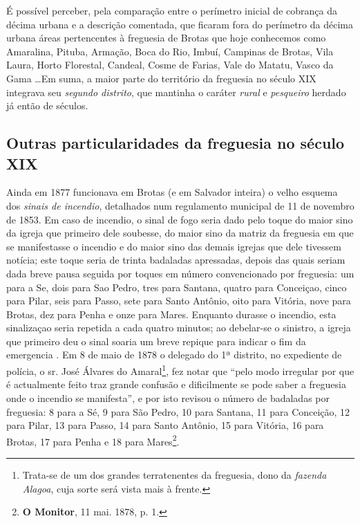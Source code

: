 \begin{enumerate}
\end{enumerate}

É possível perceber, pela comparação entre o perímetro inicial de cobrança da décima urbana e a descrição comentada, que ficaram fora do perímetro da décima urbana áreas pertencentes à freguesia de Brotas que hoje conhecemos como Amaralina, Pituba, Armação, Boca do Rio, Imbuí, Campinas de Brotas, Vila Laura, Horto Florestal, Candeal, Cosme de Farias, Vale do Matatu, Vasco da Gama \dots Em suma, a maior parte do território da freguesia no século XIX integrava seu \textit{segundo distrito}, que mantinha o caráter \textit{rural} e \textit{pesqueiro} herdado já então de séculos.

\subsection{Outras particularidades da freguesia no século XIX}

Ainda em 1877 funcionava em Brotas (e em Salvador inteira) o velho esquema dos \textit{sinais de incendio}, detalhados num regulamento municipal de 11 de novembro de 1853. Em caso de incendio, o sinal de fogo seria dado pelo toque do maior sino da igreja que primeiro dele soubesse, do maior sino da matriz da freguesia em que se manifestasse o incendio e do maior sino das demais igrejas que dele tivessem notícia; este toque seria de trinta badaladas apressadas, depois das quais seriam dada breve pausa seguida por toques em número convencionado por freguesia: um para a Se, dois para Sao Pedro, tres para Santana, quatro para Conceiçao, cinco para Pilar, seis para Passo, sete para Santo Antônio, oito para Vitória, nove para Brotas, dez para Penha e onze para Mares. Enquanto durasse o incendio, esta sinalizaçao seria repetida a cada quatro minutos; ao debelar-se o sinistro, a igreja que primeiro deu o sinal soaria um breve repique para indicar o fim da emergencia \cite[pp.~192-193]{macosta_almana_1877}. Em 8 de maio de 1878 o delegado do 1ª distrito, no expediente de polícia, o sr. José Álvares do Amaral\footnote{Trata-se de um dos grandes terratenentes da freguesia, dono da \textit{fazenda Alagoa}, cuja sorte será vista mais à frente.}, fez notar que ``pelo modo irregular por que é actualmente feito traz grande confusão e dificilmente se pode saber a freguesia onde o incendio se manifesta'', e por isto revisou o número de badaladas por freguesia: 8 para a Sé, 9 para São Pedro, 10 para Santana, 11 para Conceição, 12 para Pilar, 13 para Passo, 14 para Santo Antônio, 15 para Vitória, 16 para Brotas, 17 para Penha e 18 para Mares\footnote{\textbf{O Monitor}, 11 mai. 1878, p. 1.}.